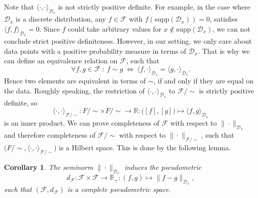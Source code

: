 \documentclass[11pt, a4paper]{article}
\newtheorem{lemma}[theorem]{Lemma}
\newtheorem{corollary}[theorem]{Corollary}
\newcommand{\R}{\mathbb{R}}
\newcommand{\D}{\mathcal{D}}
\newcommand{\F}{\mathcal{F}}
\begin{document}
Note that $\langle \cdot, \cdot \rangle_{\D_x}$ is not strictly positive definite. For example, in the case where $\D_x$ is a discrete distribution, any $f \in \F$ with $f(\text{supp}(\D_x)) = 0$, satisfies $\langle f, f \rangle_{\D_x} = 0$. Since $f$ could take arbitrary values for $x \notin \text{supp}(\D_x)$, we can not conclude strict positive definiteness. However, in our setting, we only care about data points with a positive probability measure in terms of $\D_x$. That is why we can define an equivalence relation on $\F$, such that
\[ \forall f,g \in \F \ : \ f \sim g \ \Leftrightarrow \ \langle f, \cdot \rangle_{\D_x} = \langle g, \cdot \rangle_{\D_x}. \]
Hence two elements are equivalent in terms of $\sim$, if and only if they are equal on the data. Roughly speaking, the restriction of $\langle \cdot, \cdot \rangle_{\D_x}$ to $\F / {\sim}$ is strictly positive definite, so
\[ \langle \cdot, \cdot \rangle_{\F/{\sim}} : F/{\sim} \times F/{\sim} \to \R : \big ([f],[g] \big ) \mapsto \langle f , g \rangle_{\D_x} \]
is an inner product. We can prove completeness of $\F$ with respect to $\| \cdot \|_{\D_x}$ and therefore completeness of $\F / {\sim}$ with respect to $\| \cdot \|_{\F/{\sim}}$, such that $\big ( F /{\sim}, \langle \cdot, \cdot \rangle_{\F/{\sim}} \big )$ is a Hilbert space. This is done by the following lemma.



\begin{corollary}
The seminorm $\| \cdot \|_{\D_x}$ induces the pseudometric
\[ d_{\F}: \F \times \F \to \R_+ : (f,g) \mapsto \big \| f-g \big \|_{\D_x}, \]
such that $(\F,d_{\F})$ is a complete pseudometric space.
\end{corollary}
\end{document}
